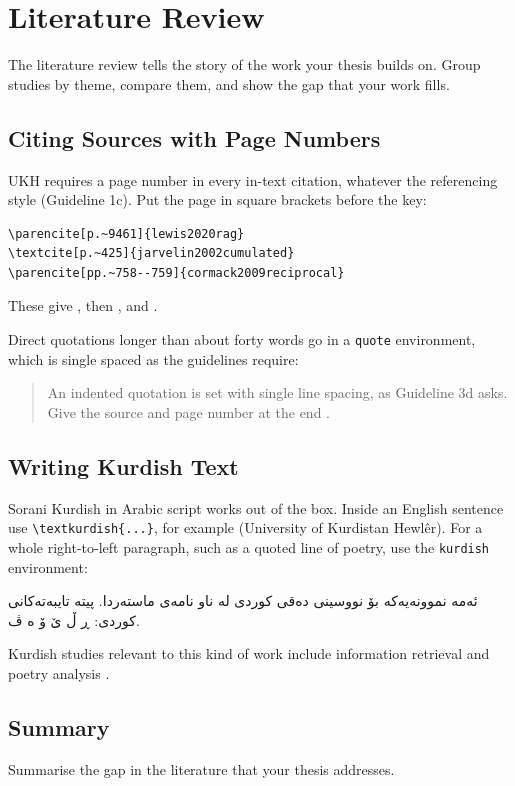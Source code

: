 \chapter{Literature Review}
\label{ch:literature}

The literature review tells the story of the work your thesis builds on. Group studies by
theme, compare them, and show the gap that your work fills.

\section{Citing Sources with Page Numbers}
UKH requires a page number in every in-text citation, whatever the referencing style
(Guideline 1c). Put the page in square brackets before the key:

\begin{verbatim}
\parencite[p.~9461]{lewis2020rag}
\textcite[p.~425]{jarvelin2002cumulated}
\parencite[pp.~758--759]{cormack2009reciprocal}
\end{verbatim}

These give \parencite[p.~9461]{lewis2020rag}, then \textcite[p.~425]{jarvelin2002cumulated},
and \parencite[pp.~758--759]{cormack2009reciprocal}.

Direct quotations longer than about forty words go in a \texttt{quote} environment, which
is single spaced as the guidelines require:

\begin{quote}
An indented quotation is set with single line spacing, as Guideline 3d asks. Give the
source and page number at the end \parencite[p.~2]{mahmudi2023meter}.
\end{quote}

\section{Writing Kurdish Text}
Sorani Kurdish in Arabic script works out of the box. Inside an English sentence use
\verb|\textkurdish{...}|, for example 
(University of Kurdistan Hewlêr). For a whole right-to-left paragraph, such as a quoted
line of poetry, use the \texttt{kurdish} environment:

\begin{kurdish}
ئەمە نموونەیەکە بۆ نووسینی دەقی کوردی لە ناو نامەی ماستەردا.
پیتە تایبەتەکانی کوردی: ڕ ڵ ێ ۆ ە ڤ.
\end{kurdish}

Kurdish studies relevant to this kind of work include information retrieval
\parencite[p.~3]{esmaili2014kurdish} and poetry analysis \parencite[p.~1]{mahmudi2023meter}.

\section{Summary}
Summarise the gap in the literature that your thesis addresses.
